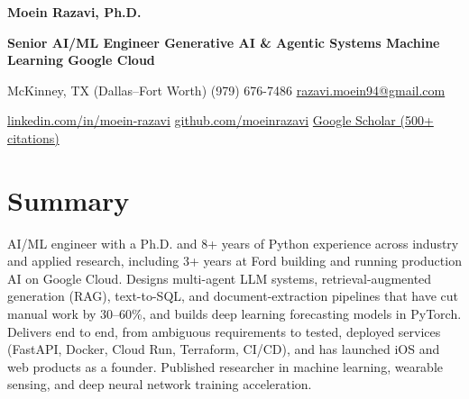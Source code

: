 \documentclass[letterpaper,10pt]{article}
\begin{document}
\fontsize{10}{12.1}\selectfont

{\centering
{\fontsize{20}{24}\selectfont\bfseries\color{ink} Moein Razavi, Ph.D.}\par\vspace{2pt}
{\fontsize{11}{13}\selectfont\bfseries Senior AI/ML Engineer \textbar{} Generative AI \& Agentic Systems \textbar{} Machine Learning \textbar{} Google Cloud}\par\vspace{2pt}
McKinney, TX (Dallas--Fort Worth) \textbar{} (979) 676-7486 \textbar{} \href{mailto:razavi.moein94@gmail.com}{razavi.moein94@gmail.com}\par
\href{https://linkedin.com/in/moein-razavi}{linkedin.com/in/moein-razavi} \textbar{} \href{https://github.com/moeinrazavi}{github.com/moeinrazavi} \textbar{} \href{https://scholar.google.com/citations?hl=en&user=t2fdg1YAAAAJ}{Google Scholar (500+ citations)}\par
}

\section{Summary}
AI/ML engineer with a Ph.D. and 8+ years of Python experience across industry and applied research, including 3+ years at Ford building and running production AI on Google Cloud. Designs multi-agent LLM systems, retrieval-augmented generation (RAG), text-to-SQL, and document-extraction pipelines that have cut manual work by 30--60\%, and builds deep learning forecasting models in PyTorch. Delivers end to end, from ambiguous requirements to tested, deployed services (FastAPI, Docker, Cloud Run, Terraform, CI/CD), and has launched iOS and web products as a founder. Published researcher in machine learning, wearable sensing, and deep neural network training acceleration.
\end{document}
